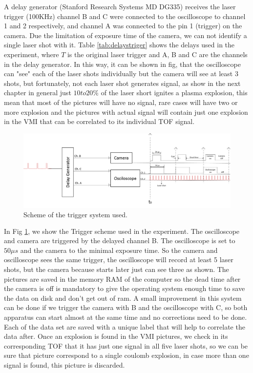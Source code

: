 A delay generator (Stanford Research Systems MD DG335) receives the laser trigger (100KHz) channel B and C were connected to the oscilloscope to channel 1 and 2 respectively, and channel A was connected to the pin 1 (trigger) on the camera. Due the limitation of exposure time of the camera, we can not identify a single laser shot with it. Table \ref{tab:delaystriger} shows the delays used in the experiment, where $T$ is the original laser trigger and  A, B and C are the channels in the delay generator. In this way, it can be shown in fig, that the oscilloscope can "see" each of the laser shots individually but the camera will see at least 3 shots, but fortunately, not each laser shot generates signal, as show in the next chapter in general just $10 to 20\%$ of the laser short ignites a plasma explosion, this mean that most of the pictures will have no signal, rare cases will have two or more explosion and the pictures with actual signal will contain just one  explosion in the VMI that can be correlated to its individual TOF signal. 

\begin{figure}[hbtp]
\label{fig:triggers}
\centering
\includegraphics[width = 14 cm]{../Images/Trigger scheme.png}
\caption[Trigger Scheme]{Scheme of the trigger system used.  }
\end{figure}

In Fig \ref{fig:triggers}, we show the Trigger scheme used in the experiment. The oscilloscope and camera are triggered by the delayed channel B. The oscilloscope is set to $50\mu s$ and the camera to the minimal exposure time. So the camera and oscilloscope sees the same trigger, the oscilloscope will record at least 5 laser shots, but the camera because starts later just can see three as shown. The pictures are saved in the memory RAM of the computer so the dead time after the camera is off is mandatory to give the operating system enough time to save the data on disk and don't get out of ram. A small improvement in this system can be done if we trigger the camera with B and the oscilloscope with C, so both apparatus can start almost at the same time and no corrections need to be done. Each of the data set are saved with a unique label that will help to correlate the data after. Once an explosion is found in the VMI pictures, we check in its corresponding TOF that it has just one signal in all five laser shots, so we can be sure that picture correspond to a single coulomb explosion, in case more than one signal is found, this picture is discarded. 

